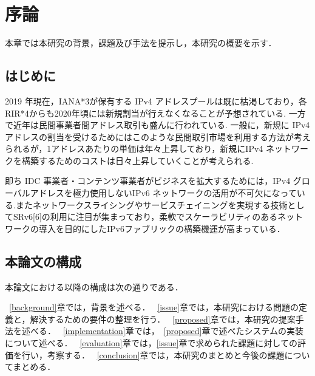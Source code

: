 \chapter{序論}
\label{introduction}

本章では本研究の背景，課題及び手法を提示し，本研究の概要を示す．

\section{はじめに}
\label{introduction:background}

2019 年現在，IANA*3が保有する IPv4 アドレスプールは既に枯渇しており，各 RIR*4からも2020年頃には新規割当が行えなくなることが予想されている. 一方で近年は民間事業者間アドレス取引も盛んに行われている.
一般に，新規に IPv4 アドレスの割当を受けるためにはこのような民間取引市場を利用する方法が考えられるが，1アドレスあたりの単価は年々上昇しており，新規にIPv4 ネットワークを構築するためのコストは日々上昇していくことが考えられる.

即ち IDC 事業者・コンテンツ事業者がビジネスを拡大するためには，IPv4 グローバルアドレスを極力使用しないIPv6 ネットワークの活用が不可欠になっている.またネットワークスライシングやサービスチェイニングを実現する技術としてSRv6[6]の利用に注目が集まっており，柔軟でスケーラビリティのあるネットワークの導入を目的にしたIPv6ファブリックの構築機運が高まっている．


\section{本論文の構成}

本論文における以降の構成は次の通りである．

~\ref{background}章では，背景を述べる．
~\ref{issue}章では，本研究における問題の定義と，解決するための要件の整理を行う．
~\ref{proposed}章では，本研究の提案手法を述べる．
~\ref{implementation}章では，~\ref{proposed}章で述べたシステムの実装について述べる．
~\ref{evaluation}章では，\ref{issue}章で求められた課題に対しての評価を行い，考察する．
~\ref{conclusion}章では，本研究のまとめと今後の課題についてまとめる．


